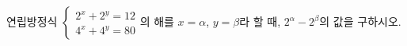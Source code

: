 연립방정식 $\begin{cases} 2^{x}+2^{y}=12 \\ 4^{x}+4^{y}=80 \end{cases}$의 해를 $x=\alpha$, $y=\beta$라 할 때, $2^{\alpha}-2^{\beta}$의 값을 구하시오. \dmcondfill{$\alpha>\beta$}{}
